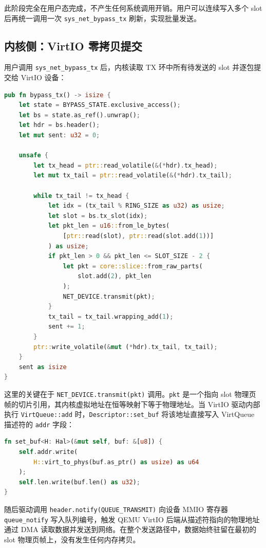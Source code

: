 此阶段完全在用户态完成，不产生任何系统调用开销。用户可以连续写入多个 slot 后再统一调用一次 \texttt{sys\_net\_bypass\_tx} 刷新，实现批量发送。

\subsection{内核侧：VirtIO 零拷贝提交}

用户调用 \texttt{sys\_net\_bypass\_tx} 后，内核读取 TX 环中所有待发送的 slot 并逐包提交给 VirtIO 设备：

\begin{lstlisting}[language=Rust, caption={内核 TX 刷新：遍历 TX 环并提交 VirtIO}]
pub fn bypass_tx() -> isize {
    let state = BYPASS_STATE.exclusive_access();
    let bs = state.as_ref().unwrap();
    let hdr = bs.header();
    let mut sent: u32 = 0;

    unsafe {
        let tx_head = ptr::read_volatile(&(*hdr).tx_head);
        let mut tx_tail = ptr::read_volatile(&(*hdr).tx_tail);

        while tx_tail != tx_head {
            let idx = (tx_tail % RING_SIZE as u32) as usize;
            let slot = bs.tx_slot(idx);
            let pkt_len = u16::from_le_bytes(
                [ptr::read(slot), ptr::read(slot.add(1))]
            ) as usize;
            if pkt_len > 0 && pkt_len <= SLOT_SIZE - 2 {
                let pkt = core::slice::from_raw_parts(
                    slot.add(2), pkt_len
                );
                NET_DEVICE.transmit(pkt);
            }
            tx_tail = tx_tail.wrapping_add(1);
            sent += 1;
        }
        ptr::write_volatile(&mut (*hdr).tx_tail, tx_tail);
    }
    sent as isize
}
\end{lstlisting}

这里的关键在于 \texttt{NET\_DEVICE.transmit(pkt)} 调用。\texttt{pkt} 是一个指向 slot 物理页帧的切片引用，其内核虚拟地址在恒等映射下等于物理地址。当 VirtIO 驱动内部执行 \texttt{VirtQueue::add} 时，\texttt{Descriptor::set\_buf} 将该地址直接写入 VirtQueue 描述符的 \texttt{addr} 字段：

\begin{lstlisting}[language=Rust, caption={VirtIO 描述符设置缓冲区地址}]
fn set_buf<H: Hal>(&mut self, buf: &[u8]) {
    self.addr.write(
        H::virt_to_phys(buf.as_ptr() as usize) as u64
    );
    self.len.write(buf.len() as u32);
}
\end{lstlisting}

随后驱动调用 \texttt{header.notify(QUEUE\_TRANSMIT)} 向设备 MMIO 寄存器 \texttt{queue\_notify} 写入队列编号，触发 QEMU VirtIO 后端从描述符指向的物理地址通过 DMA 读取数据并发送到网络。在整个发送路径中，数据始终驻留在最初的 slot 物理页帧上，没有发生任何内存拷贝。

